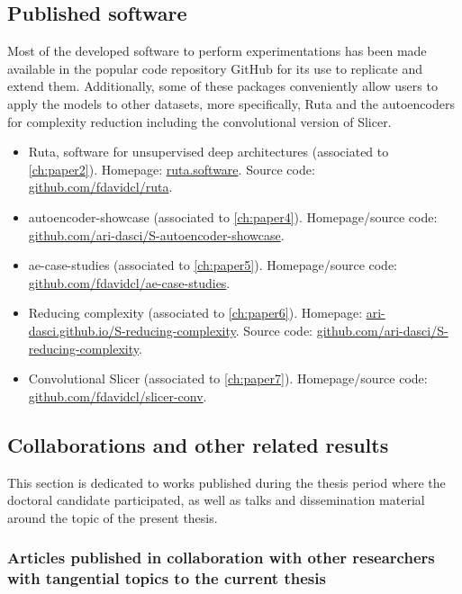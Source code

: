 \subsection{Published software}

Most of the developed software to perform experimentations has been made available in the popular code repository GitHub for its use to replicate and extend them. Additionally, some of these packages conveniently allow users to apply the models to other datasets, more specifically, Ruta and the autoencoders for complexity reduction including the convolutional version of Slicer.

\begin{itemize}
    \item Ruta, software for unsupervised deep architectures (associated to \autoref{ch:paper2}). Homepage: \href{https://ruta.software/}{ruta.software}. Source code: \href{https://github.com/fdavidcl/ruta}{github.com/fdavidcl/ruta}.
    \item autoencoder-showcase (associated to \autoref{ch:paper4}). Homepage/source code: \href{https://github.com/ari-dasci/S-autoencoder-showcase}{github.com/ari-dasci/S-autoencoder-showcase}.
    \item ae-case-studies (associated to \autoref{ch:paper5}). Homepage/source code: \href{https://github.com/fdavidcl/ae-case-studies}{github.com/fdavidcl/ae-case-studies}.
    \item Reducing complexity (associated to \autoref{ch:paper6}). Homepage: \href{https://ari-dasci.github.io/S-reducing-complexity/}{ari-dasci.github.io/S-reducing-complexity}. Source code: \href{https://github.com/ari-dasci/S-reducing-complexity}{github.com/ari-dasci/S-reducing-complexity}.
    \item Convolutional Slicer (associated to \autoref{ch:paper7}). Homepage/source code: \href{https://github.com/fdavidcl/slicer-conv}{github.com/fdavidcl/slicer-conv}.
\end{itemize}

\subsection{Collaborations and other related results}

This section is dedicated to works published during the thesis period where the doctoral candidate participated, as well as talks and dissemination material around the topic of the present thesis.

\subsubsection{Articles published in collaboration with other researchers with tangential topics to the current thesis}

